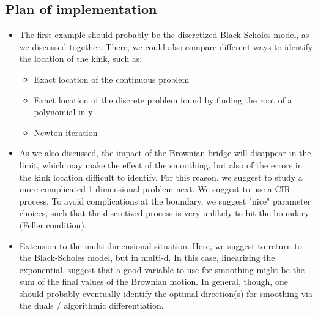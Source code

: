 \documentclass[11pt]{article}
\begin{document}

\subsection{Plan of implementation}

\begin{itemize}
	\item The first example should probably be the discretized Black-Scholes
	model, as we discussed together. There, we could also compare
	different ways to identify the location of the kink, such as:
	\begin{itemize}
		\item Exact location of the continuous problem
		\item  Exact location of the discrete problem found by finding the root of a polynomial in y
		\item Newton iteration
	\end{itemize}
	\item  As we also discussed, the impact of the Brownian bridge will disappear in the limit, which may make the effect of the smoothing, 	but also of the errors in the kink location difficult to identify. For 	this reason, we suggest to study a more complicated 1-dimensional 	problem next. We suggest to use a CIR process. To avoid complications at the boundary, we suggest "nice" parameter choices, such that the discretized process is very unlikely to hit the boundary (Feller
	condition).
	\item Extension to the multi-dimensional situation. Here, we suggest to
	return to the Black-Scholes model, but in multi-d. In this case,
	linearizing the exponential, suggest that a good variable to use for smoothing might be the sum of the final values of the Brownian motion.
	In general, though, one should probably eventually identify the
	optimal direction(s) for smoothing via the duals / algorithmic
	differentiation.
\end{itemize}
\end{document}
